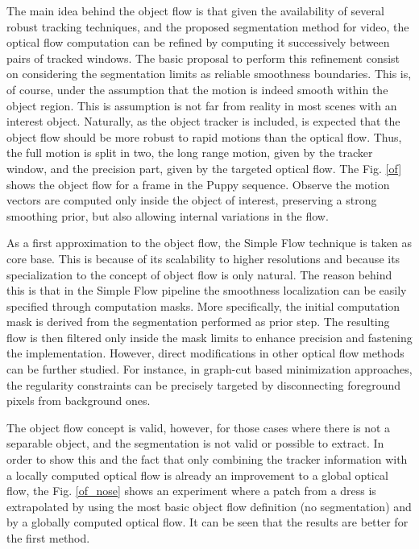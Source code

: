 The main idea behind the object flow is that given the availability of several robust tracking techniques, and the proposed
segmentation method for video, the optical flow computation can be refined by computing it successively between pairs
of tracked windows. The basic proposal to perform this refinement consist on considering the segmentation limits  as reliable smoothness boundaries. 
This is, of course, under the assumption that the motion is indeed smooth within the object region. 
This is assumption is not far from reality in most scenes with an interest object. 
Naturally, as the object tracker is included, is expected that the object flow should be more robust to rapid motions than the
optical flow. 
Thus, the full motion is split in two, the long range motion, given by the tracker window, and the precision part, given by the targeted optical flow. The Fig. \ref{of} shows 
the object flow for a frame in the Puppy sequence. Observe the motion vectors are computed only inside the object of interest, preserving a strong smoothing prior, but 
also allowing internal variations in the flow. 

As a first approximation to the object flow, the Simple Flow technique \cite{c21} is taken as core base. This is because of its scalability 
to higher resolutions and because its specialization to the concept of object flow is only natural. The reason behind this is that in the Simple Flow pipeline 
the smoothness localization can be easily specified through computation masks. More specifically, the initial computation mask is derived from 
the segmentation performed as prior step. The resulting flow is then filtered only inside the mask limits to enhance precision and fastening the 
implementation. However, direct modifications in other optical flow methods can be further studied. For instance, in graph-cut based 
minimization approaches, the regularity constraints can be precisely targeted by disconnecting foreground pixels from background ones.

The object flow concept is valid, however, for those cases where there is not a separable object, and the segmentation is not valid or possible to extract. 
In order to show this and the fact that only combining the tracker information with a locally computed optical flow is already an improvement to a global 
optical flow, the Fig. \ref{of_nose} shows an experiment where a patch from a dress is extrapolated by using the most basic object flow definition (no segmentation) 
and by a globally computed optical flow. It can be seen that the results are better for the first method.

